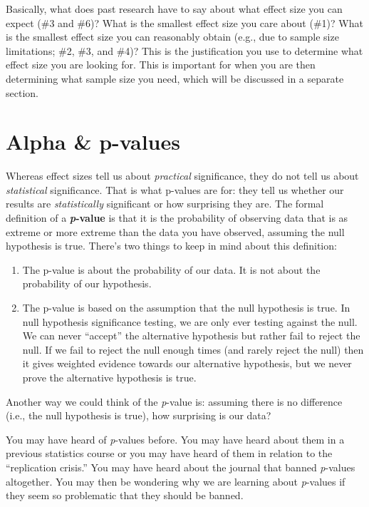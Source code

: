 \documentclass[
]{book}
\providecommand{\tightlist}{%
  \setlength{\itemsep}{0pt}\setlength{\parskip}{0pt}}
\begin{document}
Basically, what does past research have to say about what effect size you can expect (\#3 and \#6)? What is the smallest effect size you care about (\#1)? What is the smallest effect size you can reasonably obtain (e.g., due to sample size limitations; \#2, \#3, and \#4)? This is the justification you use to determine what effect size you are looking for. This is important for when you are then determining what sample size you need, which will be discussed in a separate section.

\hypertarget{alpha-p-values}{%
\section{Alpha \& p-values}\label{alpha-p-values}}

Whereas effect sizes tell us about \emph{practical} significance, they do not tell us about \emph{statistical} significance. That is what p-values are for: they tell us whether our results are \emph{statistically} significant or how surprising they are. The formal definition of a \textbf{\emph{p}-value} is that it is the probability of observing data that is as extreme or more extreme than the data you have observed, assuming the null hypothesis is true. There's two things to keep in mind about this definition:

\begin{enumerate}
\def\labelenumi{\arabic{enumi}.}
\tightlist
\item
  The p-value is about the probability of our data. It is not about the probability of our hypothesis.
\item
  The p-value is based on the assumption that the null hypothesis is true. In null hypothesis significance testing, we are only ever testing against the null. We can never ``accept'' the alternative hypothesis but rather fail to reject the null. If we fail to reject the null enough times (and rarely reject the null) then it gives weighted evidence towards our alternative hypothesis, but we never prove the alternative hypothesis is true.
\end{enumerate}

Another way we could think of the \emph{p}-value is: assuming there is no difference (i.e., the null hypothesis is true), how surprising is our data?

You may have heard of \emph{p}-values before. You may have heard about them in a previous statistics course or you may have heard of them in relation to the ``replication crisis.'' You may have heard about the journal that banned \emph{p}-values altogether. You may then be wondering why we are learning about \emph{p}-values if they seem so problematic that they should be banned.
\end{document}
